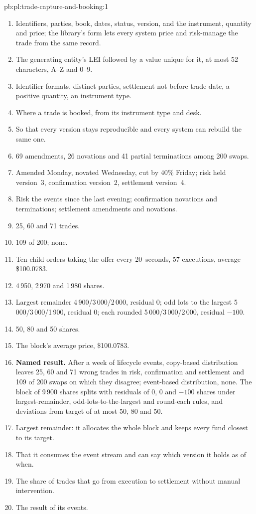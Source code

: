 \begin{solution}{pb:pl:trade-capture-and-booking:1}
\begin{enumerate}
\item Identifiers, parties, book, dates, status, version, and the instrument, quantity and price; the library's form lets every system price and
risk-manage the trade from the same record.
\item The generating entity's LEI followed by a value unique for it, at most 52 characters, A--Z and 0--9.
\item Identifier formats, distinct parties, settlement not before trade date, a positive quantity, an instrument type.
\item Where a trade is booked, from its instrument type and desk.
\item So that every version stays reproducible and every system can rebuild the same one.
\item 69 amendments, 26 novations and 41 partial terminations among 200 swaps.
\item Amended Monday, novated Wednesday, cut by 40\% Friday; risk held version~3, confirmation version~2, settlement version~4.
\item Risk the events since the last evening; confirmation novations and terminations; settlement amendments and novations.
\item 25, 60 and 71 trades.
\item 109 of 200; none.
\item Ten child orders taking the offer every 20~seconds, 57 executions, average \$100.0783.
\item 4\,950, 2\,970 and 1\,980 shares.
\item Largest remainder 4\,900/3\,000/2\,000, residual 0; odd lots to the largest 5\,000/3\,000/1\,900, residual 0; each rounded
5\,000/3\,000/2\,000, residual $-100$.
\item 50, 80 and 50 shares.
\item The block's average price, \$100.0783.
\item \textbf{Named result.} After a week of lifecycle events, copy-based distribution leaves 25, 60 and 71 wrong trades in risk, confirmation and
settlement and 109 of 200 swaps on which they disagree; event-based distribution, none. The block of 9\,900 shares splits with residuals of 0, 0
and $-100$ shares under largest-remainder, odd-lots-to-the-largest and round-each rules, and deviations from target of at most 50, 80 and 50.
\item Largest remainder: it allocates the whole block and keeps every fund closest to its target.
\item That it consumes the event stream and can say which version it holds as of when.
\item The share of trades that go from execution to settlement without manual intervention.
\item The result of its events.
\end{enumerate}
\end{solution}

